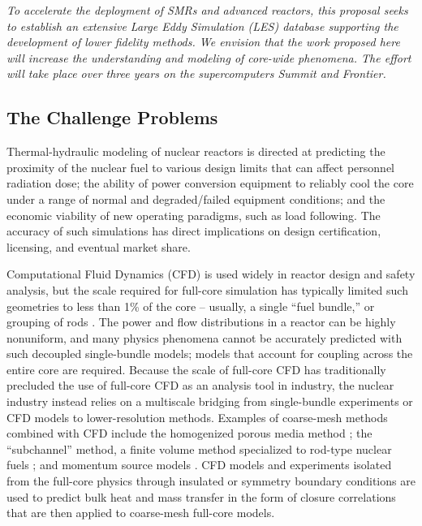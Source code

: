 \textit{To accelerate the deployment of SMRs and advanced reactors, this
proposal seeks to establish an extensive Large Eddy Simulation (LES) database
supporting the development of lower fidelity methods. We envision that the work
proposed here will increase the understanding and modeling of core-wide
phenomena. The effort will take place over three years on the supercomputers Summit
and Frontier.}

\vspace{-.25in} \subsection{The Challenge Problems}
\vspace{-.2in}


Thermal-hydraulic modeling of nuclear reactors is directed at predicting the proximity of the nuclear fuel to various design limits that can affect personnel radiation dose; the ability of power conversion equipment to reliably cool the core under a range of normal and degraded/failed equipment conditions; and the economic viability of new operating paradigms, such as load following. The accuracy of such simulations has direct implications on design certification, licensing, and eventual market share. 

Computational Fluid Dynamics (CFD) is used widely in reactor design and safety analysis, but the scale required for full-core simulation has typically limited such geometries to less than 1\% of the core -- usually, a single ``fuel bundle,'' or grouping of rods \cite{wang2020,fanning,wang2020b}. The power and flow distributions in a reactor can be highly nonuniform, and many physics phenomena cannot be accurately predicted with such decoupled single-bundle models; models that account for coupling across the entire core are required. Because the scale of full-core CFD has traditionally precluded the use of full-core CFD as an analysis tool in industry, the nuclear industry instead relies on a multiscale bridging from single-bundle experiments or CFD models to lower-resolution methods. Examples of coarse-mesh methods combined with CFD include the homogenized porous media method \cite{wang2020c}; the ``subchannel'' method, a finite volume method specialized to rod-type nuclear fuels \cite{blyth}; and momentum source models \cite{hu2013}. CFD models and experiments isolated from the full-core physics through insulated or symmetry boundary conditions are used to predict bulk heat and mass transfer in the form of closure correlations that are then applied to coarse-mesh full-core models.

